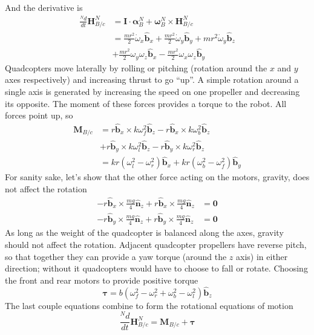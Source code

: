\documentclass[lettersize,journal]{IEEEtran}
\begin{document}
And the derivative is
\begin{align}
  \frac{^Nd}{dt}\mathbf{H}^N_{B/c} &= \mathbf{I}\cdot\boldsymbol\alpha^N_B + \boldsymbol\omega^N_B \times \mathbf{H}^N_{B/c} \nonumber\\
  &= \frac{mr^2}{2}\dot\omega_x \mathbf{\hat{b}}_x + \frac{mr^2}{2}\dot\omega_y \mathbf{\hat{b}}_y + mr^2\dot\omega_y \mathbf{\hat{b}}_z \nonumber \\ 
  &+\frac{mr^2}{2}\omega_y \omega_z \mathbf{\hat{b}}_x - \frac{mr^2}{2} \omega_x\omega_z \mathbf{\hat{b}}_y \label{EQN:AngMomDer}
\end{align}
Quadcopters move laterally by rolling or pitching (rotation around the $x$ and $y$ axes respectively) and increasing thrust to go ``up''. A simple rotation around a single axis is generated by increasing the speed on one propeller and decreasing its opposite. The moment of these forces provides a torque to the robot. All forces point up, so
\begin{align}
  \mathbf{M}_{B/c} &= r \mathbf{\hat{b}}_x \times k\omega_f^2 \mathbf{\hat{b}}_z - r\mathbf{\hat{b}}_x \times k\omega_b^2 \mathbf{\hat{b}}_z \nonumber \\
  &+ r\mathbf{\hat{b}}_y\times k\omega_l^2 \mathbf{\hat{b}}_z  - r\mathbf{\hat{b}}_y \times k\omega_r^2 \mathbf{\hat{b}}_z\nonumber\\
  &= kr \left(\omega_l^2-\omega_r^2\right) \mathbf{\hat{b}}_x+ kr\left(\omega_b^2-\omega_f^2\right) \mathbf{\hat{b}}_y
\end{align}
For sanity sake, let's show that the other force acting on the motors, gravity, does not affect the rotation
\begin{align}
  -r\mathbf{\hat{b}}_x \times \frac{mg}{4} \mathbf{\hat{n}}_z+r\mathbf{\hat{b}}_x \times \frac{mg}{4} \mathbf{\hat{n}}_z &= \mathbf{0} \nonumber \\
  -r\mathbf{\hat{b}}_y \times \frac{mg}{4} \mathbf{\hat{n}}_z+r\mathbf{\hat{b}}_y \times \frac{mg}{4} \mathbf{\hat{n}}_z	&= \mathbf{0} \nonumber	 
\end{align}
As long as the weight of the quadcopter is balanced along the axes, gravity should not affect the rotation. Adjacent quadcopter propellers have reverse pitch, so that together they can provide a yaw torque (around the $z$ axis) in either direction; without it quadcopters would have to choose to fall or rotate. Choosing the front and rear motors to provide positive torque
\begin{equation}
  \boldsymbol\tau = b\left(\omega_f^2-\omega_r^2+\omega_b^2-\omega_l^2\right)\mathbf{\hat{b}}_z
\end{equation}
The last couple equations combine to form the rotational equations of motion
\begin{equation}
  \frac{^Nd}{dt}\mathbf{H}^N_{B/c} = \mathbf{M}_{B/c} + \boldsymbol\tau \label{EQN:RotationalEOM}
\end{equation}
\end{document}
